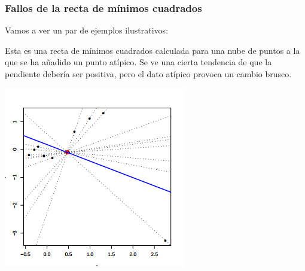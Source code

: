 \subsubsection{Fallos de la recta de mínimos cuadrados}

Vamos a ver un par de ejemplos ilustrativos:

\begin{example}

Esta es una recta de mínimos cuadrados calculada para una nube de puntos a la que se ha añadido un punto atípico. Se ve una cierta tendencia de que la pendiente debería ser positiva, pero el dato atípico provoca un cambio brusco.
\begin{center}
\includegraphics[scale=0.9]{img/rmc_atipico2.png}
\end{center}

\end{example}

